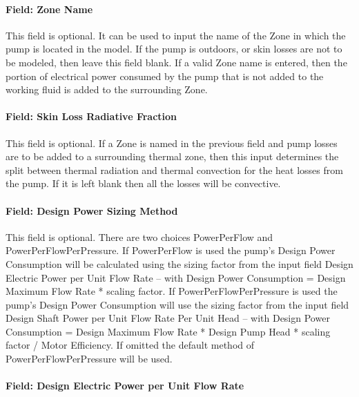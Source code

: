 \paragraph{Field: Zone Name}\label{field-zone-name-4-003}

This field is optional. It can be used to input the name of the Zone in which the pump is located in the model. If the pump is outdoors, or skin losses are not to be modeled, then leave this field blank. If a valid Zone name is entered, then the portion of electrical power consumed by the pump that is not added to the working fluid is added to the surrounding Zone.

\paragraph{Field: Skin Loss Radiative Fraction}\label{field-skin-loss-radiative-fraction-4}

This field is optional. If a Zone is named in the previous field and pump losses are to be added to a surrounding thermal zone, then this input determines the split between thermal radiation and thermal convection for the heat losses from the pump. If it is left blank then all the losses will be convective.

\paragraph{Field: Design Power Sizing Method}\label{field-design-power-sizing-method-4}

This field is optional. There are two choices PowerPerFlow and PowerPerFlowPerPressure. If PowerPerFlow is used the pump's Design Power Consumption will be calculated using the sizing factor from the input field Design Electric Power per Unit Flow Rate -- with Design Power Consumption = Design Maximum Flow Rate * scaling factor. If PowerPerFlowPerPressure is used the pump's Design Power Consumption will use the sizing factor from the input field Design Shaft Power per Unit Flow Rate Per Unit Head -- with Design Power Consumption = Design Maximum Flow Rate * Design Pump Head * scaling factor / Motor Efficiency. If omitted the default method of PowerPerFlowPerPressure will be used.

\paragraph{Field: Design Electric Power per Unit Flow Rate}\label{field-design-electric-power-per-unit-flow-rate-3}

